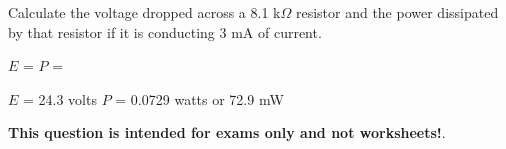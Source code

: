 

Calculate the voltage dropped across a 8.1 k$\Omega$ resistor and the power dissipated by that resistor if it is conducting 3 mA of current.

\vskip 10pt

$E$ = \hskip 150pt $P$ =







$E$ = 24.3 volts \hskip 100pt $P$ = 0.0729 watts or 72.9 mW







{\bf This question is intended for exams only and not worksheets!}.



